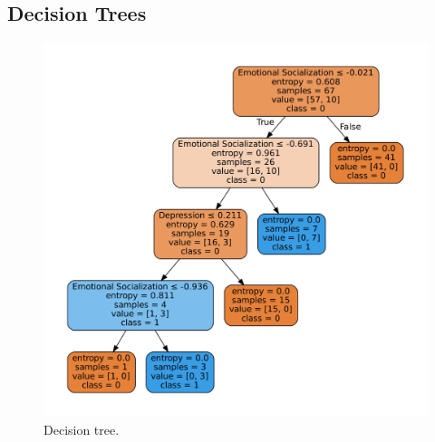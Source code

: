 \documentclass[conference]{IEEEtran}
\theoremstyle{definition}
\theoremstyle{remark}
\theoremstyle{remark}
\begin{document}
\subsection{Decision Trees}
\begin{figure}
    \includegraphics[width=\columnwidth]{figs/tree-graph.pdf}
    \caption{Decision tree.}
    \label{fig:dt}
\end{figure}
\end{document}
